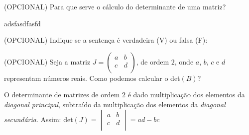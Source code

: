 \documentclass[pdftex, brazil, 12pt, oneside, addpoints]{exam}
\newcommand{\vf}[1][{}]{%
  \fillin[#1][0.25in]%
}
\begin{document}
\begin{questions}
\question
(OPCIONAL) Para que serve o cálculo do determinante de uma matriz?
\begin{solution}
  adsfasdfasfd
\end{solution}

\question
(OPCIONAL) Indique se a sentença é verdadeira (V) ou falsa (F):

\question
(OPCIONAL) Seja a matriz
$J = \begin{pmatrix}
  a & b\\
  c & d\\
\end{pmatrix}$, de ordem $2$, onde $a$, $b$, $c$ e $d$ representam números reais. Como podemos
calcular o det$(B)$?
\begin{solution}
  O determinante de matrizes de ordem $2$ é dado multiplicação dos elementos da
  \emph{diagonal principal}, subtraído da multiplicação dos elementos da
  \emph{diagonal secundária}. Assim:
  det$(J) = \begin{vmatrix}
  a & b\\
  c & d\\
\end{vmatrix} = ad - bc$
\end{solution}


\end{questions}
\end{document}
